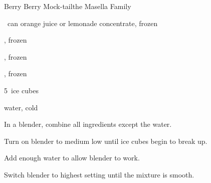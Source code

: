 \begin{recipe}{Berry Berry Mock-tail}{the Masella Family}{}

\begin{ingredients}
\item \half~can orange juice or lemonade concentrate, frozen 
\item \C{\half} , frozen 
\item \C{\half} , frozen 
\item \C{\half} , frozen 
\item 5~ice cubes
\item water, cold 
\end{ingredients}

\begin{directions}
\item In a blender, combine all ingredients except the water.
\item Turn on blender to medium low until ice cubes begin to break up.
\item Add enough water to allow blender to work.
\item Switch blender to highest setting until the mixture is smooth.
\end{directions}

\end{recipe}
